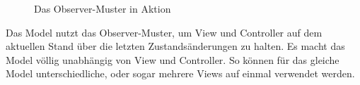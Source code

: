 \documentclass[11pt,a4paper,titlepage]{scrreprt}
\begin{document}
\enlargethispage{1cm}
\begin{figure}[h]
\caption{Das Observer-Muster in Aktion}
\end{figure}

Das Model nutzt das Observer-Muster, um View und Controller auf dem aktuellen
Stand über die letzten Zustandsänderungen zu halten.
Es macht das Model völlig unabhängig von View und Controller. So können für das gleiche
Model unterschiedliche, oder sogar mehrere Views auf einmal verwendet werden.
\end{document}
